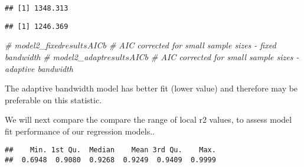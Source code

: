 \documentclass[
]{book}
\newenvironment{Shaded}{\begin{snugshade}}{\end{snugshade}}
\newcommand{\CommentTok}[1]{\textcolor[rgb]{0.56,0.35,0.01}{\textit{#1}}}
\newcommand{\FunctionTok}[1]{\textcolor[rgb]{0.00,0.00,0.00}{#1}}
\newcommand{\NormalTok}[1]{#1}
\newcommand{\SpecialCharTok}[1]{\textcolor[rgb]{0.00,0.00,0.00}{#1}}
\begin{document}
\begin{Shaded}
\end{Shaded}

\begin{verbatim}
## [1] 1348.313
\end{verbatim}

\begin{Shaded}
\end{Shaded}

\begin{verbatim}
## [1] 1246.369
\end{verbatim}

\begin{Shaded}
\begin{Highlighting}[]
\CommentTok{\# model2\_fixed$results$AICb \# AIC corrected for small sample sizes {-} fixed bandwidth }
\CommentTok{\# model2\_adapt$results$AICb \# AIC corrected for small sample sizes {-} adaptive bandwidth}
\end{Highlighting}
\end{Shaded}

The adaptive bandwidth model has better fit (lower value) and therefore may be preferable on this statistic.

We will next compare the compare the range of local r2 values, to assess model fit performance of our regression models..

\begin{Shaded}
\end{Shaded}

\begin{verbatim}
##    Min. 1st Qu.  Median    Mean 3rd Qu.    Max. 
##  0.6948  0.9080  0.9268  0.9249  0.9409  0.9999
\end{verbatim}

\begin{Shaded}
\end{Shaded}
\end{document}
